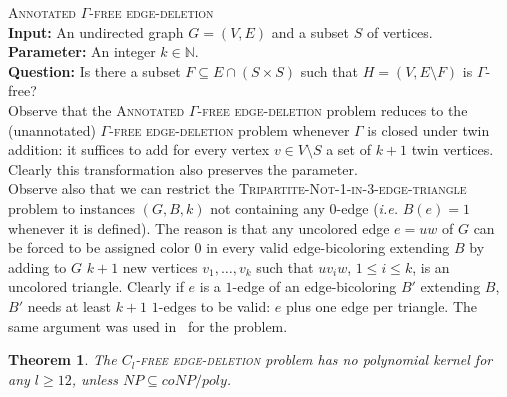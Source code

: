 \documentclass[11pt]{article}
\newtheorem{theorem}[lemma]{Theorem}
\newcommand{\tgbc}{\textsc{Tripartite-Not-1-in-3-edge-triangle}}
\begin{document}
\noindent
\textsc{Annotated $\Gamma$-free edge-deletion}\\
\textbf{Input:} An undirected graph $G=(V,E)$ and a subset $S$ of vertices.\\
\textbf{Parameter:} An integer $k\in\mathbb{N}$.\\
\textbf{Question:} Is there a subset $F \subseteq E\cap(S\times S)$ such that $H=(V,E\setminus F)$ is $\Gamma$-free?\\

Observe that the \textsc{Annotated $\Gamma$-free edge-deletion} problem reduces to the (unannotated) \textsc{$\Gamma$-free edge-deletion} problem whenever $\Gamma$ is closed under twin addition: it suffices to add for every vertex $v\in V\setminus S$ a set of $k+1$ twin vertices. Clearly this transformation also preserves the parameter.  \\


Observe also that we can restrict the \tgbc{} problem to instances $(G,B,k)$ not containing any $0$-edge (\emph{i.e.} $B(e) = 1$ whenever it is defined). The reason is that any uncolored edge $e=uw$ of $G$ can be forced to be assigned color $0$ in every valid edge-bicoloring extending $B$ by adding to $G$ $k+1$ new vertices $v_1,\dots,v_{k}$ such that $uv_iw$, $1\leqslant i\leqslant k$, is an uncolored triangle. Clearly if $e$ is a $1$-edge of an edge-bicoloring $B'$ extending $B$, $B'$ needs at least $k+1$ $1$-edges to be valid: $e$ plus one edge per triangle. The same argument was used in~\cite{KW09} for the \notone{} problem.

\newpage

\begin{theorem} \label{prop3} 
The \textsc{$C_l$-free edge-deletion} problem has no polynomial kernel for any $l \geqslant 12$, unless $NP \subseteq coNP / poly$.
\end{theorem}
\end{document}
